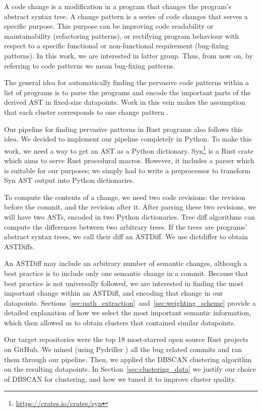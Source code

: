 A code change is a modification in a program that changes the program's abstract syntax tree. A change pattern is a series of code changes that serves a specific purpose. This purpose can be improving code readability or maintainability (refactoring patterns), or rectifying program behaviour with respect to a specific functional or non-functional requirement (bug-fixing patterns). In this work, we are interested in latter group. Thus, from now on, by referring to code patterns we mean bug-fixing patterns.

The general idea for automatically finding the pervasive code patterns within a list of programs is to parse the programs and encode the important parts of the derived AST in fixed-size datapoints. Work in this vein makes the assumption that each cluster corresponds to one change pattern \cite{hanam2016discovering} \cite{campos2019discovering} \cite{yang2022mining}.

Our pipeline for finding pervasive patterns in Rust programs also follows this idea. We decided to implement our pipeline completely in Python. To make this work, we need a way to get an AST as a Python dictionary. Syn\footnote{\url{https://crates.io/crates/syn}} is a Rust crate which aims to serve Rust procedural macros. However, it includes a parser which is suitable for our purposes; we simply had to write a preprocessor to transform Syn AST output into Python dictionaries.

To compute the contents of a change, we need two code revisions: the revision before the commit, and the revision after it. After parsing these two revisions, we will have two ASTs, encoded in two Python dictionaries. Tree diff algorithms can compute the differences between two arbitrary trees. If the trees are programs' abstract syntax trees, we call their diff an ASTDiff. We use dictdiffer to obtain ASTDiffs.

An ASTDiff may include an arbitrary number of semantic changes, although a best practice is to include only one semantic change in a commit. Because that best practice is not universally followed, we are interested in finding the most important change within an ASTDiff, and encoding that change in our datapoints. Sections~\ref{sec:path_extraction}~and~\ref{sec:weighting_scheme} provide a detailed explanation of how we select the most important semantic information, which then allowed us to obtain clusters that contained similar datapoints. 

Our target repositories were the top 18 most-starred open source Rust projects on GitHub. We mined (using Pydriller \cite{spadini2018pydriller}) all the bug related commits and ran them through our pipeline. Then, we applied the DBSCAN clustering algorithm \cite{ester1996density} on the resulting datapoints. In Section~\ref{sec:clustering_data} we justify our choice of DBSCAN for clustering, and how we tuned it to improve cluster quality. 


